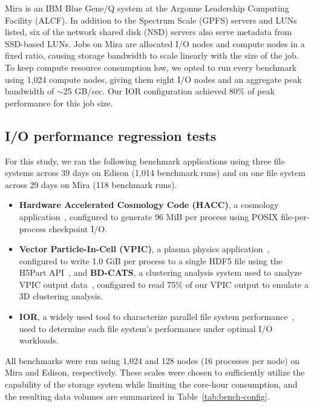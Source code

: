 Mira is an IBM Blue Gene/Q system at the Argonne Leadership Computing Facility (ALCF).
In addition to the Spectrum Scale (GPFS) servers and LUNs listed, six of the network shared disk (NSD) servers also serve metadata from SSD-based LUNs.
Jobs on Mira are allocated I/O nodes and compute nodes in a fixed ratio, causing storage bandwidth to scale linearly with the size of the job.
To keep compute resource consumption low, we opted to run every benchmark using 1,024 compute nodes, giving them eight I/O nodes and an aggregate peak bandwidth of $\sim$25 GB/sec.
Our IOR configuration achieved 80\% of peak performance for this job size.

\subsection{I/O performance regression tests} \label{sec:methods/tests}

For this study, we ran the following benchmark applications
using three file systems across 39 days on Edison (1,014 benchmark runs) and on one file system across 29 days on Mira (118 benchmark runs).

\begin{itemize}[leftmargin=*]
\item 
\textbf{Hardware Accelerated Cosmology Code (HACC)}, a cosmology application~\cite{habib2012}, configured to generate 96 MiB per process using POSIX file-per-process checkpoint I/O.
 \item
\textbf{Vector Particle-In-Cell (VPIC)}, a plasma physics application~\cite{Bowers2008}, configured to write 1.0 GiB per process to a single HDF5 file using the H5Part API~\cite{H5Part}, and 
\textbf{BD-CATS}, a clustering analysis system used to analyze VPIC output data~\cite{Patwary2015}, configured to read 75\% of our VPIC output to emulate a 3D clustering analysis.
\item
\textbf{IOR}, a widely used tool to characterize parallel file system performance~\cite{Yildiz2016,Xie2012,Lofstead2010,Uselton2010}, used to determine each file system's performance under optimal I/O workloads.
 \end{itemize}

All benchmarks were run using 1,024 and 128 nodes (16 processes per node) on Mira and Edison, respectively.
These scales were chosen to sufficiently utilize the capability of the storage system while limiting the core-hour consumption,
and the resulting data volumes are summarized in Table~\ref{tab:bench-config}.


